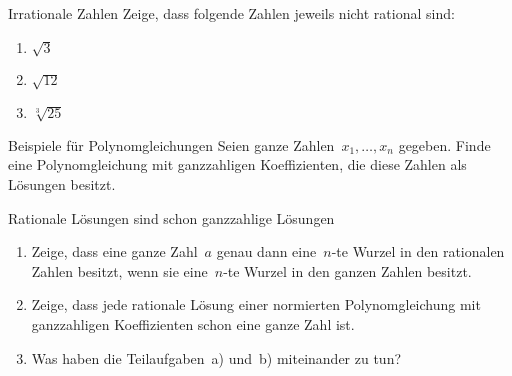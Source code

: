 \documentclass{algblatt}
\begin{document}

\begin{aufgabe}{Irrationale Zahlen}
Zeige, dass folgende Zahlen jeweils nicht rational sind:
\begin{enumerate}
\item $\sqrt{3}$
\item $\sqrt{12}$
\item $\sqrt[3]{25}$
\end{enumerate}
\end{aufgabe}

\begin{aufgabe}{Beispiele für Polynomgleichungen}
Seien ganze Zahlen~$x_1, \ldots, x_n$ gegeben. Finde eine Polynomgleichung mit
ganzzahligen Koeffizienten, die diese Zahlen als Lösungen besitzt.
\end{aufgabe}

\begin{aufgabe}{Rationale Lösungen sind schon ganzzahlige Lösungen}
\begin{enumerate}
  \item Zeige, dass eine ganze Zahl~$a$ genau dann eine~$n$-te Wurzel in den
  rationalen Zahlen besitzt, wenn sie eine~$n$-te Wurzel in den ganzen Zahlen
  besitzt.
  \item Zeige, dass jede rationale Lösung einer normierten Polynomgleichung mit
  ganzzahligen Koeffizienten schon eine ganze Zahl ist.
  \item Was haben die Teilaufgaben~a) und~b) miteinander zu tun?
\end{enumerate}
\end{aufgabe}
\end{document}

